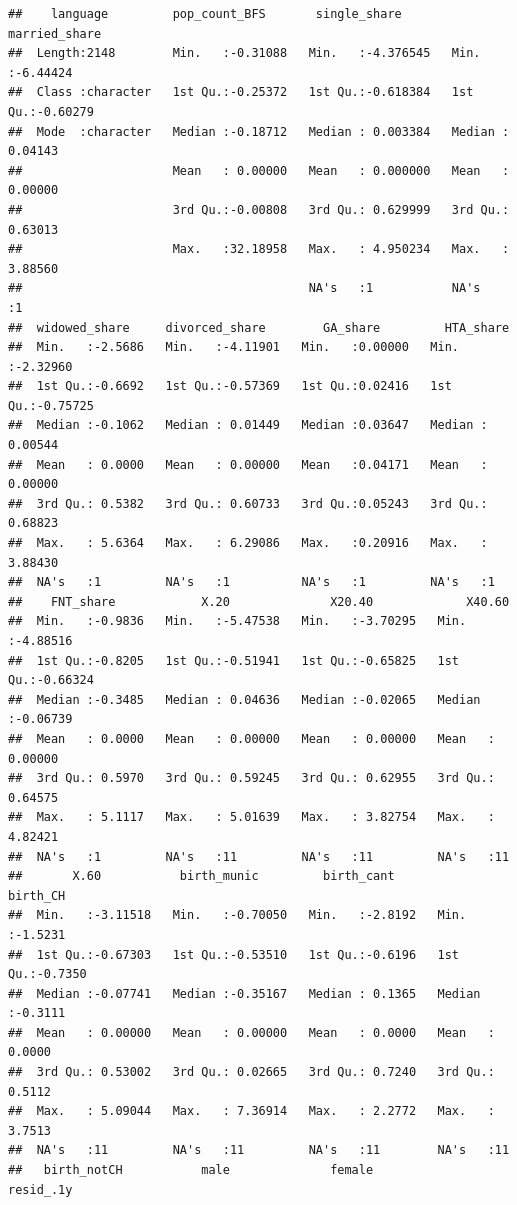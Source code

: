 \documentclass[
]{article}
\begin{document}
\begin{verbatim}
##    language         pop_count_BFS       single_share       married_share     
##  Length:2148        Min.   :-0.31088   Min.   :-4.376545   Min.   :-6.44424  
##  Class :character   1st Qu.:-0.25372   1st Qu.:-0.618384   1st Qu.:-0.60279  
##  Mode  :character   Median :-0.18712   Median : 0.003384   Median : 0.04143  
##                     Mean   : 0.00000   Mean   : 0.000000   Mean   : 0.00000  
##                     3rd Qu.:-0.00808   3rd Qu.: 0.629999   3rd Qu.: 0.63013  
##                     Max.   :32.18958   Max.   : 4.950234   Max.   : 3.88560  
##                                        NA's   :1           NA's   :1         
##  widowed_share     divorced_share        GA_share         HTA_share       
##  Min.   :-2.5686   Min.   :-4.11901   Min.   :0.00000   Min.   :-2.32960  
##  1st Qu.:-0.6692   1st Qu.:-0.57369   1st Qu.:0.02416   1st Qu.:-0.75725  
##  Median :-0.1062   Median : 0.01449   Median :0.03647   Median : 0.00544  
##  Mean   : 0.0000   Mean   : 0.00000   Mean   :0.04171   Mean   : 0.00000  
##  3rd Qu.: 0.5382   3rd Qu.: 0.60733   3rd Qu.:0.05243   3rd Qu.: 0.68823  
##  Max.   : 5.6364   Max.   : 6.29086   Max.   :0.20916   Max.   : 3.88430  
##  NA's   :1         NA's   :1          NA's   :1         NA's   :1         
##    FNT_share            X.20              X20.40             X40.60        
##  Min.   :-0.9836   Min.   :-5.47538   Min.   :-3.70295   Min.   :-4.88516  
##  1st Qu.:-0.8205   1st Qu.:-0.51941   1st Qu.:-0.65825   1st Qu.:-0.66324  
##  Median :-0.3485   Median : 0.04636   Median :-0.02065   Median :-0.06739  
##  Mean   : 0.0000   Mean   : 0.00000   Mean   : 0.00000   Mean   : 0.00000  
##  3rd Qu.: 0.5970   3rd Qu.: 0.59245   3rd Qu.: 0.62955   3rd Qu.: 0.64575  
##  Max.   : 5.1117   Max.   : 5.01639   Max.   : 3.82754   Max.   : 4.82421  
##  NA's   :1         NA's   :11         NA's   :11         NA's   :11        
##       X.60           birth_munic         birth_cant         birth_CH      
##  Min.   :-3.11518   Min.   :-0.70050   Min.   :-2.8192   Min.   :-1.5231  
##  1st Qu.:-0.67303   1st Qu.:-0.53510   1st Qu.:-0.6196   1st Qu.:-0.7350  
##  Median :-0.07741   Median :-0.35167   Median : 0.1365   Median :-0.3111  
##  Mean   : 0.00000   Mean   : 0.00000   Mean   : 0.0000   Mean   : 0.0000  
##  3rd Qu.: 0.53002   3rd Qu.: 0.02665   3rd Qu.: 0.7240   3rd Qu.: 0.5112  
##  Max.   : 5.09044   Max.   : 7.36914   Max.   : 2.2772   Max.   : 3.7513  
##  NA's   :11         NA's   :11         NA's   :11        NA's   :11       
##   birth_notCH           male              female            resid_.1y      

\end{verbatim}
\end{document}
